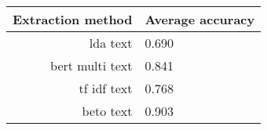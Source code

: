 \begin{tabular}{|r|l|}
  \hline
  Extraction method & Average accuracy \\ 
  \hline
  lda text & 0.690 \\ 
  \hline
  bert multi text & 0.841 \\ 
  \hline
  tf idf text & 0.768 \\ 
  \hline
  beto text & 0.903 \\ 
  \hline
\end{tabular}
